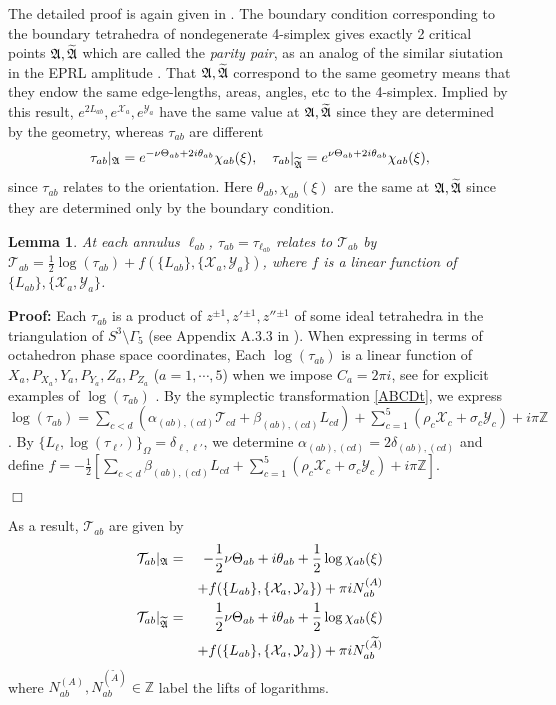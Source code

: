 \documentclass[aps,prd,notitlepage,nofootinbib,superscriptaddress,groupedaddress,twocolumn]{revtex4-1}
\newtheorem{lemma}[theorem]{Lemma}
\def\be{\begin{eqnarray}}
\def\ee{\end{eqnarray}}
\newcommand{\ct}{\mathcal T}
\newcommand{\cx}{\mathcal X}
\newcommand{\cy}{\mathcal Y}
\renewcommand{\a}{\alpha}
\renewcommand{\b}{\beta}
\newcommand{\G}{\Gamma}
\newcommand{\sig}{\sigma}
\renewcommand{\O}{\Omega}
\renewcommand{\t}{\tau}
\begin{document}
The detailed proof is again given in \cite{HHKR}. The boundary condition corresponding to the boundary tetrahedra of nondegenerate 4-simplex gives exactly 2 critical points $\mathfrak{A},\widetilde{\mathfrak{A}}$ which are called the \emph{parity pair}, as an analog of the similar siutation in the EPRL amplitude \cite{semiclassical}. That $\mathfrak{A},\widetilde{\mathfrak{A}}$ correspond to the same geometry means that they endow the same edge-lengths, areas, angles, etc to the 4-simplex. Implied by this result, $e^{2 L_{ab}},e^{\cx_a},e^{\cy_a}$ have the same value at $\mathfrak{A},\widetilde{\mathfrak{A}}$ since they are determined by the geometry, whereas $\t_{ab}$ are different
\be
\t_{ab}|_\Fa=e^{- \nu \Theta_{ab}+2i\theta_{ab}}\chi_{ab}(\xi),\quad \t_{ab}|_{\widetilde{\Fa}}=e^{ \nu\Theta_{ab}+2i\theta_{ab}}\chi_{ab}(\xi),\nonumber
\ee
since $\t_{ab}$ relates to the orientation. Here $\theta_{ab},\chi_{ab}(\xi)$ are the same at $\mathfrak{A},\widetilde{\mathfrak{A}}$ since they are determined only by the boundary condition.


\begin{lemma}

At each annulus $\ell_{ab}$, $\t_{ab}=\t_{\ell_{ab}}$ relates to $\ct_{ab}$ by $\ct_{ab}=\frac{1}{2}\log(\t_{ab})+f(\{L_{ab}\},\{\cx_a,\cy_a\})$, where $f$ is a linear function of $\{L_{ab}\},\{\cx_a,\cy_a\}$.

\end{lemma}

\textbf{Proof:} Each $\t_{ab}$ is a product of $z^{\pm 1},z'{}^{\pm 1},z''{}^{\pm 1}$ of some ideal tetrahedra in the triangulation of $S^3\setminus\G_5$ (see Appendix A.3.3 in \cite{DGV}). When expressing in terms of octahedron phase space coordinates, Each $\log(\t_{ab})$ is a linear function of $X_a,P_{X_a},Y_a,P_{Y_a},Z_a,P_{Z_a}$ ($a=1,\cdots,5$) when we impose $C_a=2\pi i$, see \cite{hanSUSY} for explicit examples of $\log(\t_{ab})$%
. By the symplectic transformation \eqref{ABCDt}, we express $\log(\t_{ab})=\sum_{c<d}(\a_{(ab),(cd)}\ct_{cd}+\b_{(ab),(cd)}L_{cd})+\sum_{c=1}^5(\rho_c\cx_c+\sig_c\cy_c)+i \pi\mathbb{Z}$. By $\{L_\ell,\log(\tau_{\ell'})\}_\O=\delta_{\ell,\ell'}$, we determine $\a_{(ab),(cd)}=2\delta_{(ab),(cd)}$ and define $f=-\frac{1}{2}[\sum_{c<d}\b_{(ab),(cd)}L_{cd}+\sum_{c=1}^5(\rho_c\cx_c+\sig_c\cy_c)+i \pi\mathbb{Z}] $.

$\Box$


As a result, $\ct_{ab}$ are given by
\be
\ct_{ab}|_\Fa&=&-\frac{1}{2} \nu\Theta_{ab}+i\theta_{ab}+\frac{1}{2}\log\chi_{ab}(\xi)\nonumber\\
&&+f(\{L_{ab}\},\{\cx_a,\cy_a\})+\pi i N^{(A)}_{ab}\\
\ct_{ab}|_{\widetilde \Fa}&=&\frac{1}{2}\nu \Theta_{ab}+i\theta_{ab}+\frac{1}{2}\log\chi_{ab}(\xi)\nonumber\\
&&+f(\{L_{ab}\},\{\cx_a,\cy_a\})+\pi i N^{(\widetilde{A})}_{ab}
\ee
where $N^{(A)}_{ab},N^{(\widetilde{A})}_{ab}\in\mathbb{Z}$ label the lifts of logarithms.  
\end{document}
